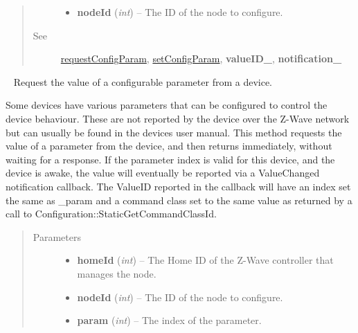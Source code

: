 \documentclass[letterpaper,10pt,english]{sphinxmanual}
\begin{document}
\begin{fulllineitems}
\begin{fulllineitems}
\begin{quote}
\begin{description}
\begin{itemize}
\item {} 
\textbf{nodeId} (\emph{int}) -- The ID of the node to configure.

\end{itemize}

\item[{See}] \leavevmode
{\hyperref[libopenzwave:requestconfigparam]{requestConfigParam}}, {\hyperref[libopenzwave:setconfigparam]{setConfigParam}}, {\color{red}\bfseries{}valueID\_}, {\color{red}\bfseries{}notification\_}

\end{description}\end{quote}

\end{fulllineitems}


\begin{fulllineitems}
\label{libopenzwave:libopenzwave.PyManager.requestConfigParam}~\label{libopenzwave:requestconfigparam}
Request the value of a configurable parameter from a device.

Some devices have various parameters that can be configured to control the
device behaviour.  These are not reported by the device over the Z-Wave network
but can usually be found in the devices user manual.  This method requests
the value of a parameter from the device, and then returns immediately,
without waiting for a response.  If the parameter index is valid for this
device, and the device is awake, the value will eventually be reported via a
ValueChanged notification callback.  The ValueID reported in the callback will
have an index set the same as \_param and a command class set to the same value
as returned by a call to Configuration::StaticGetCommandClassId.
\begin{quote}\begin{description}
\item[{Parameters}] \leavevmode\begin{itemize}
\item {} 
\textbf{homeId} (\emph{int}) -- The Home ID of the Z-Wave controller that manages the node.

\item {} 
\textbf{nodeId} (\emph{int}) -- The ID of the node to configure.

\item {} 
\textbf{param} (\emph{int}) -- The index of the parameter.


\end{itemize}
\end{description}
\end{quote}
\end{fulllineitems}
\end{fulllineitems}
\end{document}
